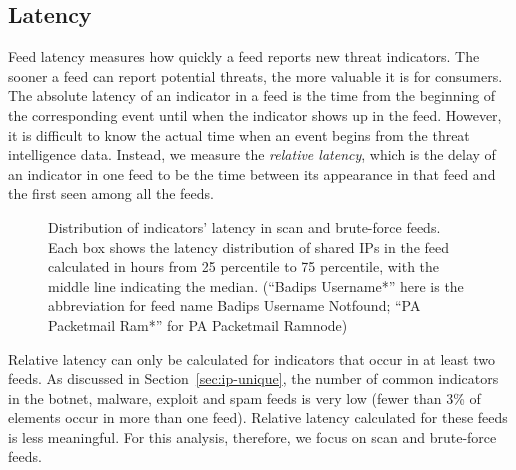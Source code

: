 \subsection{Latency}
\label{sec:ip-timing}

Feed latency measures how quickly a feed reports new threat indicators. The
sooner a feed can report potential threats, the more valuable it is for
consumers. The absolute latency of an indicator in a feed is the time from
the beginning of the corresponding event until when the indicator shows up in
the feed. However, it is difficult to know the actual time when an event begins
from the threat intelligence data. Instead, we measure the \textit{relative
latency}, which is the delay of an indicator in one feed to be the time between
its appearance in that feed and the first seen among all the feeds.

\begin{figure}[t!]
\centering
{}


\caption{Distribution of indicators' latency in scan and brute-force feeds.
Each box shows the latency distribution of shared IPs in the feed calculated in hours
from 25 percentile to 75 percentile, with the middle line indicating the median.
(``Badips Username*'' here is the abbreviation for feed name Badips
Username Notfound; ``PA Packetmail Ram*'' for PA Packetmail Ramnode) }
\label{fig:firstseen}
\end{figure}


Relative latency can only be calculated for
indicators that occur in at least two feeds. As discussed in
Section~\ref{sec:ip-unique}, the number of common indicators in the botnet, malware, exploit and spam feeds is very low (fewer than 3\% of elements occur in more than one feed). Relative latency calculated for these feeds is less meaningful. For this analysis, therefore, we focus on scan and brute-force feeds.

